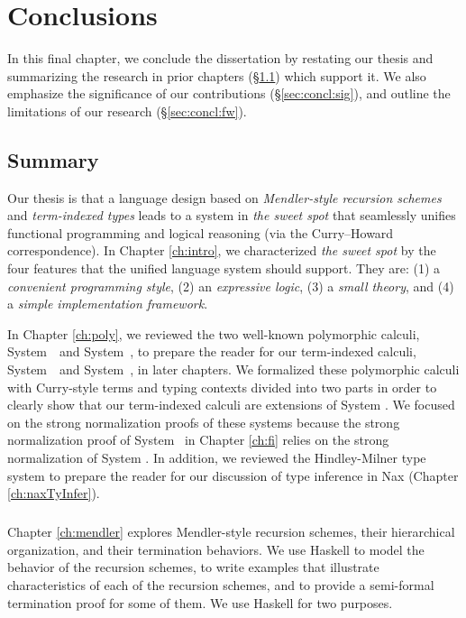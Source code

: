 \chapter{Conclusions}\label{ch:concl} In this final chapter, we conclude the
dissertation by restating our thesis and summarizing the research in prior
chapters (\S\ref{sec:concl:summary}) which support it. We also emphasize
the significance of our contributions (\S\ref{sec:concl:sig}), and outline the
limitations of our research (\S\ref{sec:concl:fw}).

\section{Summary}\label{sec:concl:summary}
Our thesis is that a language design based on
\emph{Mendler-style recursion schemes} and \emph{term-indexed types}
leads  to a system in \emph{the sweet spot} that seamlessly unifies
functional programming and logical reasoning
(via the Curry--Howard correspondence).
In Chapter \ref{ch:intro}, we characterized \emph{the sweet spot} by
the four features that the unified language system should support.
They are: (1) a \emph{convenient programming style},
(2) an \emph{expressive logic}, (3) a \emph{small theory}, and
(4) a \emph{simple implementation framework}.

In Chapter \ref{ch:poly}, we reviewed the two well-known polymorphic calculi,
System~\F\ and System~\Fw, to prepare the reader for
our term-indexed calculi, System~\Fi\ and System~\Fixi, in later chapters.
We formalized these polymorphic calculi with Curry-style terms and
typing contexts divided into two parts in order to clearly show that
our term-indexed calculi are extensions of System \Fw.
We focused on the strong normalization proofs of these systems
because the strong normalization proof of System \Fi\ in Chapter \ref{ch:fi}
relies on the strong normalization of System \Fw. In addition, we reviewed
the Hindley-Milner type system to prepare the reader for our discussion of
type inference in Nax (Chapter \ref{ch:naxTyInfer}).

\paragraph{}
Chapter \ref{ch:mendler} explores Mendler-style recursion schemes,
their hierarchical organization, and their termination behaviors.
We use Haskell to model the behavior of the recursion schemes, to write
examples that illustrate characteristics of each of the recursion schemes,
and to provide a semi-formal termination proof for some of them.
We use Haskell for two purposes.

